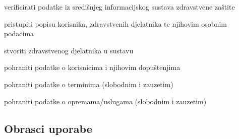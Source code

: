 \begin{packed_enum}
\begin{packed_enum}
				
			\end{packed_enum}
			
			
			\item  {}
			
			\begin{packed_enum}
				
				\item verificirati podatke iz središnjeg informacijskog sustava zdravstvene zaštite
				\item pristupiti popisu korisnika, zdravstvenih djelatnika te njihovim osobnim podacima
				\item stvoriti zdravstvenog djelatnika u sustavu
				
			\end{packed_enum}
			
			\item  {}
			
			\begin{packed_enum}
				
				\item pohraniti podatke o korisnicima i njihovim dopuštenjima
				\item pohraniti podatke o terminima (slobodnim i zauzetim)
				\item pohraniti podatke o opremama/uslugama (slobodnim i zauzetim)
				
			\end{packed_enum}
		\end{packed_enum}
			
			\eject 
			
			
				
			\subsection{Obrasci uporabe}
	

